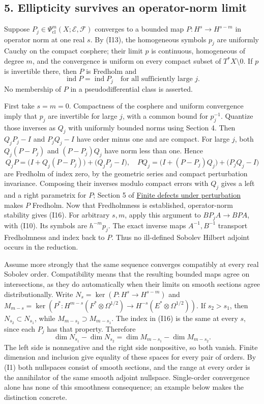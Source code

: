 \documentclass[
  11pt,
]{article}
\begin{document}
\subsection{5. Ellipticity survives an operator-norm
limit}\label{ellipticity-survives-an-operator-norm-limit}

Suppose \(P_j\in\Psi^m_{\mathrm{cl}}(X;\mathcal E,\mathcal F)\)
converges to a bounded map \(P:H^s\to H^{s-m}\) in operator norm at one
real \(s\). By (I13), the homogeneous symbols \(p_j\) are uniformly
Cauchy on the compact cosphere; their limit \(p\) is continuous,
homogeneous of degree \(m\), and the convergence is uniform on every
compact subset of \(T^*X\setminus0\). If \(p\) is invertible there, then
\(P\) is Fredholm and \[
\operatorname{ind}P=\operatorname{ind}P_j\quad\text{for all sufficiently large }j.
\tag{I16}
\] No membership of \(P\) in a pseudodifferential class is asserted.

First take \(s=m=0\). Compactness of the cosphere and uniform
convergence imply that \(p_j\) are invertible for large \(j\), with a
common bound for \(p_j^{-1}\). Quantize those inverses as \(Q_j\) with
uniformly bounded norms using Section 4. Then \(Q_jP_j-I\) and
\(P_jQ_j-I\) have order minus one and are compact. For large \(j\), both
\(Q_j(P-P_j)\) and \((P-P_j)Q_j\) have norm less than one. Hence \[
Q_jP=\bigl(I+Q_j(P-P_j)\bigr)+\bigl(Q_jP_j-I\bigr),
\quad
PQ_j=\bigl(I+(P-P_j)Q_j\bigr)+\bigl(P_jQ_j-I\bigr)
\tag{I17}
\] are Fredholm of index zero, by the geometric series and compact
perturbation invariance. Composing their inverses modulo compact errors
with \(Q_j\) gives a left and a right parametrix for \(P\); Section 5 of
\href{fredholm-stability.pdf}{Finite defects under perturbation} makes
\(P\) Fredholm. Now that Fredholmness is established, operator-norm
stability gives (I16). For arbitrary \(s,m\), apply this argument to
\(BP_jA\to BPA\), with (I10). Its symbols are \(h^{-m}p_j\). The exact
inverse maps \(A^{-1},B^{-1}\) transport Fredholmness and index back to
\(P\). Thus no ill-defined Sobolev Hilbert adjoint occurs in the
reduction.

Assume more strongly that the same sequence converges compatibly at
every real Sobolev order. Compatibility means that the resulting bounded
maps agree on intersections, as they do automatically when their limits
on smooth sections agree distributionally. Write
\(N_s=\ker(P:H^s\to H^{s-m})\) and
\(M_{m-s}=\ker(P^*:H^{m-s}(F^*\otimes\Omega^{1/2})\to H^{-s}(E^*\otimes\Omega^{1/2}))\).
If \(s_2>s_1\), then \(N_{s_2}\subset N_{s_1}\), while
\(M_{m-s_2}\supset M_{m-s_1}\). The index in (I16) is the same at every
\(s\), since each \(P_j\) has that property. Therefore \[
\dim N_{s_1}-\dim N_{s_2}
=\dim M_{m-s_1}-\dim M_{m-s_2}.
\tag{I18}
\] The left side is nonnegative and the right side nonpositive, so both
vanish. Finite dimension and inclusion give equality of these spaces for
every pair of orders. By (I1) both nullspaces consist of smooth
sections, and the range at every order is the annihilator of the same
smooth adjoint nullspace. Single-order convergence alone has none of
this smoothness consequence; an example below makes the distinction
concrete.
\end{document}
